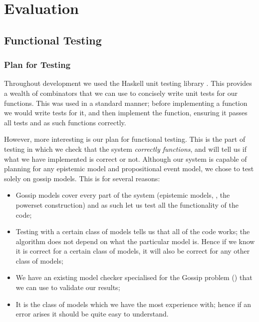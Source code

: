 \documentclass[ %
                    author={Leo Poulson},
                supervisor={Dr. Steven Ramsay},
                    degree={BSc},
                     title={Epistemic Planning for the Dynamic Gossip problem},
                  subtitle={},
                      year={2019} ]{dissertation}
\begin{document}
\newpage

\chapter{Evaluation}

\section{Functional Testing}

\subsection{Plan for Testing}

Throughout development we used the Haskell unit testing library . This provides
a wealth of combinators that we can use to concisely write unit tests for our
functions. This was used in a standard manner; before implementing a function we
would write tests for it, and then implement the function, ensuring it passes
all tests and as such functions correctly.

However, more interesting is our plan for functional testing. This is the part
of testing in which we check that the system \emph{correctly functions}, and
will tell us if what we have implemented is correct or not. Although our system
is capable of planning for any epistemic model and propositional event model, we
chose to test solely on gossip models. This is for several reasons:

\begin{itemize}
\setlength\itemsep{1em}
\item Gossip models cover every part of the system (epistemic models, \mestar,
  the powerset construction) and as such let us test all the functionality of
  the code;
\item Testing with a certain class of models tells us that all of the code
  works; the algorithm does not depend on what the particular model is. Hence if
  we know it is correct for a certain class of models, it will also be correct
  for any other class of models;
\item We have an existing model checker specialised for the Gossip problem
  (\cite{GithubGossip}) that we can use to validate our results;
\item It is the class of models which we have the most experience with; hence if
  an error arises it should be quite easy to understand.
\end{itemize}
\end{document}
